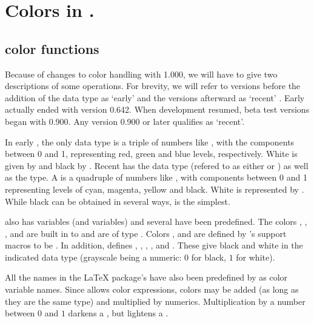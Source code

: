 \documentclass[letterpaper]{article}
\begin{document}
\section{Colors in \mfp{}.}\label{colors}

\subsection{\CMP{} color functions}\label{mpcolors}

Because of changes to color handling with \MP{} 1.000, we will have to
give two descriptions of some operations. For brevity, we will refer to
\MP{} versions before the addition of the  data type as
`early' \MP{} and the versions afterward as `recent' \MP{}. Early \MP{}
actually ended with version 0.642. When development resumed, beta test
versions began with 0.900. Any version 0.900 or later qualifies as
`recent'.

In early \MP{}, the only  data type is a triple of numbers
like , with the components between 0 and 1, representing
red, green and blue levels, respectively. White is given by
 and black by . Recent \MP{} has the
 data type (refered to as either  or )
as well as the  type. A  is a quadruple of
numbers like , with components between 0 and 1
representing levels of cyan, magenta, yellow and black. White is
represented by . While black can be obtained in several
ways, is the simplest.

\CMP{} also has  variables (and  variables) and
several have been predefined. The colors , ,
,  and  are built in to \MP{} and are of
type . Colors ,  and 
are defined by \mfp{}'s \MP{} support macros to be . In
addition, \mfp{} defines , ,
, ,  and
. These give black and white in the indicated data
type (grayscale being a numeric: $0$ for black, $1$ for white).

All the names in the \LaTeX{}  package's 
have also been predefined by \mfp{} as color variable names. Since \MP{}
allows color expressions, colors may be added (as long as they are the
same type) and multiplied by numerics. Multiplication by a number
between $0$ and $1$ darkens a , but lightens a
.
\end{document}
